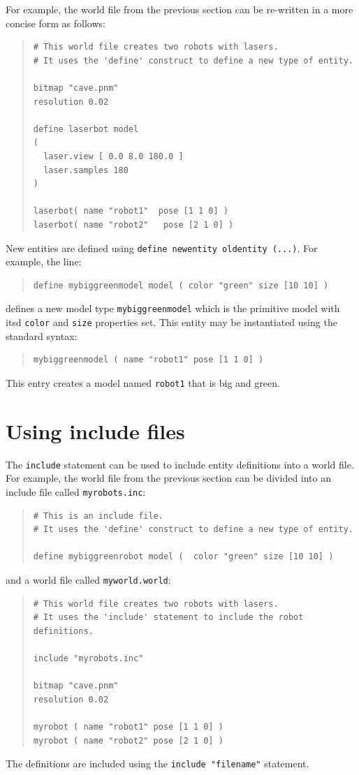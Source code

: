 \documentclass[letter,11pt,twoside]{report}
\begin{document}
For example, the world file from the previous section can be re-written
in a more concise form as follows:
\begin{quote}
\begin{verbatim}
# This world file creates two robots with lasers.
# It uses the 'define' construct to define a new type of entity.

bitmap "cave.pnm" 
resolution 0.02

define laserbot model
(
  laser.view [ 0.0 8.0 180.0 ]	
  laser.samples 180
)

laserbot( name "robot1"  pose [1 1 0] )
laserbot( name "robot2"   pose [2 1 0] )
\end{verbatim}
\end{quote}
New entities are defined using \verb'define newentity oldentity (...)'.
For example, the line:
\begin{quote}
\begin{verbatim}
define mybiggreenmodel model ( color "green" size [10 10] )
\end{verbatim}
\end{quote}
defines a new model type \verb'mybiggreenmodel' which is the primitive model with itsd \verb'color' and \verb'size' properties set.
This entity may be instantiated using the standard syntax:
\begin{quote}
\begin{verbatim}
mybiggreenmodel ( name "robot1" pose [1 1 0] )
\end{verbatim}
\end{quote}
This entry creates a model named \verb'robot1' that is big and green.

\section{Using include files}

The \verb'include' statement can be used to include entity definitions
into a world file.  For example, the world file from the previous section
can be divided into an include file called \verb'myrobots.inc':
\begin{quote}
\begin{verbatim}
# This is an include file.
# It uses the 'define' construct to define a new type of entity.

define mybiggreenrobot model (  color "green" size [10 10] )
\end{verbatim}
\end{quote}
and a world file called \verb'myworld.world':
\begin{quote}
\begin{verbatim}
# This world file creates two robots with lasers.
# It uses the 'include' statement to include the robot definitions.

include "myrobots.inc"

bitmap "cave.pnm"
resolution 0.02

myrobot ( name "robot1" pose [1 1 0] )
myrobot ( name "robot2" pose [2 1 0] )
\end{verbatim}
\end{quote}
The definitions are included using the \verb'include "filename"'
statement.
\end{document}
